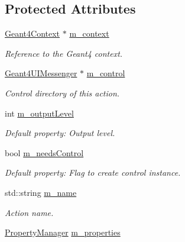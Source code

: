 \subsection*{Protected Attributes}
\begin{DoxyCompactItemize}
\item 
\hyperlink{class_d_d4hep_1_1_simulation_1_1_geant4_context}{Geant4Context} $\ast$ \hyperlink{class_d_d4hep_1_1_simulation_1_1_geant4_action_a5cdb706a8dea3dea288b5b9f65398c1d}{m\_\-context}
\begin{DoxyCompactList}\small\item\em Reference to the Geant4 context. \item\end{DoxyCompactList}\item 
\hyperlink{class_d_d4hep_1_1_simulation_1_1_geant4_u_i_messenger}{Geant4UIMessenger} $\ast$ \hyperlink{class_d_d4hep_1_1_simulation_1_1_geant4_action_aff23910feb64988b85e08b1faff251f4}{m\_\-control}
\begin{DoxyCompactList}\small\item\em Control directory of this action. \item\end{DoxyCompactList}\item 
int \hyperlink{class_d_d4hep_1_1_simulation_1_1_geant4_action_a6dc880b8e55e2dada947ad06d7678dd4}{m\_\-outputLevel}
\begin{DoxyCompactList}\small\item\em Default property: Output level. \item\end{DoxyCompactList}\item 
bool \hyperlink{class_d_d4hep_1_1_simulation_1_1_geant4_action_a4d64f5159d58c4a43d74d0ddd0a695ba}{m\_\-needsControl}
\begin{DoxyCompactList}\small\item\em Default property: Flag to create control instance. \item\end{DoxyCompactList}\item 
std::string \hyperlink{class_d_d4hep_1_1_simulation_1_1_geant4_action_adb04332ff4e52bce5b9ae1a5848b5d5e}{m\_\-name}
\begin{DoxyCompactList}\small\item\em Action name. \item\end{DoxyCompactList}\item 
\hyperlink{class_d_d4hep_1_1_property_manager}{PropertyManager} \hyperlink{class_d_d4hep_1_1_simulation_1_1_geant4_action_a30ee75af74df39aa7b34946c59da17ba}{m\_\-properties}

\end{DoxyCompactItemize}
